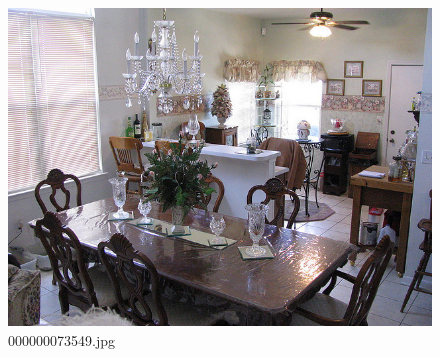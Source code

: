 \begin{figure}[h]
    \centering
    \includegraphics[width=0.8\linewidth]{../image set/hard/000000073549.jpg}
    \caption{000000073549.jpg}
\end{figure}
